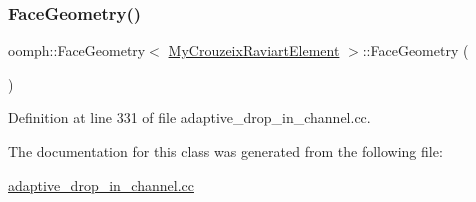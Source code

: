 \subsubsection{\texorpdfstring{Face\+Geometry()}{FaceGeometry()}}
{\footnotesize\ttfamily oomph\+::\+Face\+Geometry$<$ \hyperlink{classoomph_1_1MyCrouzeixRaviartElement}{My\+Crouzeix\+Raviart\+Element} $>$\+::Face\+Geometry (\begin{DoxyParamCaption}{ }\end{DoxyParamCaption})\hspace{0.3cm}{\ttfamily [inline]}}



Definition at line 331 of file adaptive\+\_\+drop\+\_\+in\+\_\+channel.\+cc.



The documentation for this class was generated from the following file\+:\begin{DoxyCompactItemize}
\item 
\hyperlink{adaptive__drop__in__channel_8cc}{adaptive\+\_\+drop\+\_\+in\+\_\+channel.\+cc}\end{DoxyCompactItemize}
